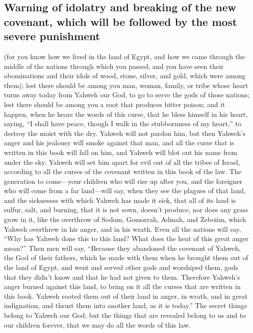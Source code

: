\hypertarget{warning-of-idolatry-and-breaking-of-the-new-covenant-which-will-be-followed-by-the-most-severe-punishment}{%
\subsection{Warning of idolatry and breaking of the new covenant, which
will be followed by the most severe
punishment}\label{warning-of-idolatry-and-breaking-of-the-new-covenant-which-will-be-followed-by-the-most-severe-punishment}}

 (for you know how we lived in the land of Egypt, and how
we came through the middle of the nations through which you passed;
 and you have seen their abominations and their idols of
wood, stone, silver, and gold, which were among them); 
lest there should be among you man, woman, family, or tribe whose heart
turns away today from Yahweh our God, to go to serve the gods of those
nations; lest there should be among you a root that produces bitter
poison;  and it happen, when he hears the words of this
curse, that he bless himself in his heart, saying, ``I shall have peace,
though I walk in the stubbornness of my heart,'' to destroy the moist
with the dry.  Yahweh will not pardon him, but then
Yahweh's anger and his jealousy will smoke against that man, and all the
curse that is written in this book will fall on him, and Yahweh will
blot out his name from under the sky.  Yahweh will set
him apart for evil out of all the tribes of Israel, according to all the
curses of the covenant written in this book of the law. 
The generation to come---your children who will rise up after you, and
the foreigner who will come from a far land---will say, when they see
the plagues of that land, and the sicknesses with which Yahweh has made
it sick,  that all of its land is sulfur, salt, and
burning, that it is not sown, doesn't produce, nor does any grass grow
in it, like the overthrow of Sodom, Gomorrah, Admah, and Zeboiim, which
Yahweh overthrew in his anger, and in his wrath.  Even
all the nations will say, ``Why has Yahweh done this to this land? What
does the heat of this great anger mean?''  Then men will
say, ``Because they abandoned the covenant of Yahweh, the God of their
fathers, which he made with them when he brought them out of the land of
Egypt,  and went and served other gods and worshiped
them, gods that they didn't know and that he had not given to them.
 Therefore Yahweh's anger burned against this land, to
bring on it all the curses that are written in this book.
 Yahweh rooted them out of their land in anger, in wrath,
and in great indignation, and thrust them into another land, as it is
today.''  The secret things belong to Yahweh our God; but
the things that are revealed belong to us and to our children forever,
that we may do all the words of this law.

